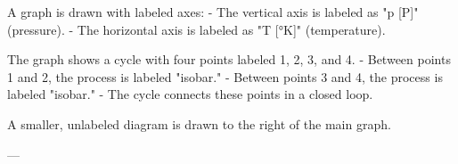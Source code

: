 A graph is drawn with labeled axes:  
- The vertical axis is labeled as "p [P]" (pressure).  
- The horizontal axis is labeled as "T [°K]" (temperature).  

The graph shows a cycle with four points labeled 1, 2, 3, and 4.  
- Between points 1 and 2, the process is labeled "isobar."  
- Between points 3 and 4, the process is labeled "isobar."  
- The cycle connects these points in a closed loop.  

A smaller, unlabeled diagram is drawn to the right of the main graph.

---